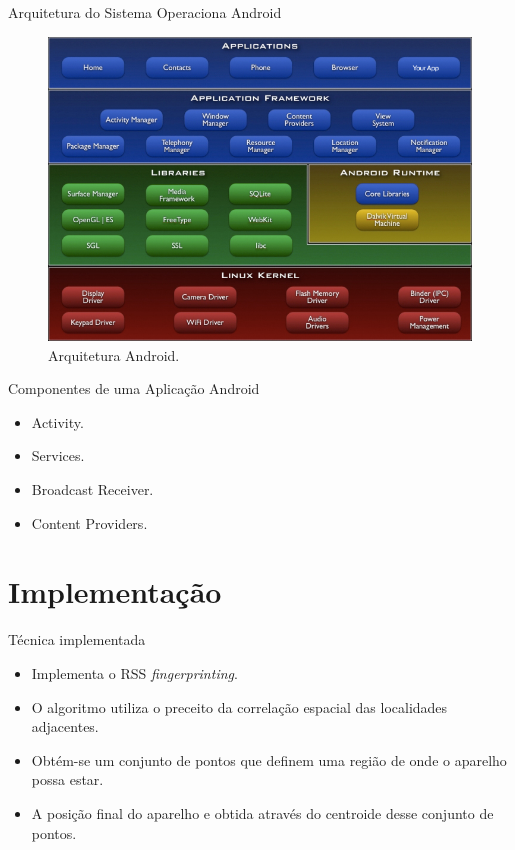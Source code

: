 \documentclass{beamer}
\newlength{\wideitemsep}
\let\olditem\item
\renewcommand{\item}{\setlength{\itemsep}{\wideitemsep}\olditem}
\begin{document}
\begin{frame}{Arquitetura do Sistema Operaciona Android}
\begin{figure}[hb]
\centering
\includegraphics[scale=0.38]{../images/Android-architecture.jpg}
\caption{Arquitetura Android\cite{android1}. }
\label{fig:android-arc}
\end{figure}
\end{frame}

\begin{frame}{Componentes de uma Aplicação Android}
\begin{itemize}
 \item Activity.
 \item Services.
 \item Broadcast Receiver.
 \item Content Providers.
\end{itemize}
\end{frame}

\section{Implementação}
\begin{frame}{Técnica implementada}
\begin{itemize}
 \item Implementa o RSS \textit{fingerprinting}.
 \item O algoritmo utiliza o preceito da correlação espacial das localidades adjacentes.
 \item Obtém-se um conjunto de pontos que definem uma região de onde o aparelho possa estar.
 \item A posição final do aparelho 
  e obtida através do centroide desse conjunto de pontos.
\end{itemize}
\end{frame}
\end{document}
